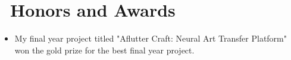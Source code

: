 \section{\texorpdfstring{\faHeartO}{}\ Honors and Awards}
\begin{itemize}[parsep=0.5ex]
    \item {}
          My final year project titled "Aflutter Craft: Neural Art Transfer Platform" won the gold prize for the best final year project.
\end{itemize}